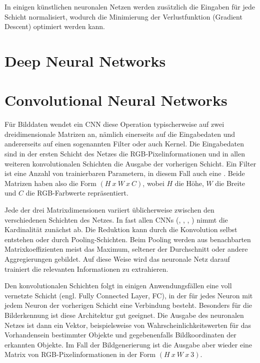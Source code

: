 In einigen künstlichen neuronalen Netzen werden zusätzlich die Eingaben für jede Schicht normalisiert, wodurch die Minimierung der Verlustfunktion (Gradient Descent) optimiert werden kann.

\section{Deep Neural Networks}
\label{sec:dnn}

\section{Convolutional Neural Networks}
\label{sec:cnn}
Für Bilddaten wendet ein CNN diese Operation typischerweise auf zwei dreidimensionale Matrizen an, nämlich einerseits auf die Eingabedaten und andererseits auf einen sogenannten Filter oder auch Kernel. Die Eingabedaten sind in der ersten Schicht des Netzes die RGB-Pixelinformationen und in allen weiteren konvolutionalen Schichten die Ausgabe der vorherigen Schicht. Ein Filter ist eine Anzahl von trainierbaren Parametern, in diesem Fall auch eine . Beide Matrizen haben also die Form $(H\ x\ W\ x\ C)$, wobei $H$ die Höhe, $W$ die Breite und $C$ die RGB-Farbwerte repräsentiert.

Jede der drei Matrixdimensionen variiert üblicherweise zwischen den verschiedenen Schichten des Netzes. In fast allen CNNs (\cite{Goodfellow-et-al-2016}, \cite{Lecun99objectrecognition}, \cite{RFB15a}, \cite{isola2018imagetoimage}) nimmt die Kardinalität zunächst ab. Die Reduktion kann durch die Konvolution selbst entstehen oder durch Pooling-Schichten. Beim Pooling werden aus benachbarten Matrixkoeffizienten meist das Maximum, seltener der Durchschnitt oder andere Aggregierungen gebildet. Auf diese Weise wird das neuronale Netz darauf trainiert die relevanten Informationen zu extrahieren. \cite{Goodfellow-et-al-2016}

Den konvolutionalen Schichten folgt in einigen Anwendungsfällen eine voll vernetzte Schicht (engl. Fully Connected Layer, FC), in der für jedes Neuron mit jedem Neuron der vorherigen Schicht eine Verbindung besteht. Besonders für die Bilderkennung ist diese Architektur gut geeignet. Die Ausgabe des neuronalen Netzes ist dann ein Vektor, beispielsweise von Wahrscheinlichkeitswerten für das Vorhandensein bestimmter Objekte und gegebenenfalls Bildkoordinaten der erkannten Objekte. Im Fall der Bildgenerierung ist die Ausgabe aber wieder eine Matrix von RGB-Pixelinformationen in der Form $(H\ x\ W\ x\ 3)$.

